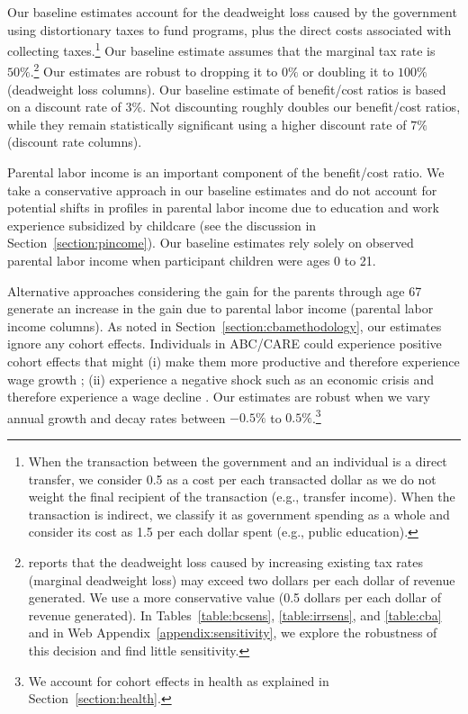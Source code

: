 Our baseline estimates account for the deadweight loss caused by the government using distortionary taxes to fund programs, plus the direct costs associated with collecting taxes.\footnote{When the transaction between the government and an individual is a direct transfer, we consider 0.5 as a cost per each transacted dollar as we do not weight the final recipient of the transaction (e.g., transfer income). When the transaction is indirect, we classify it as government spending as a whole and consider its cost as 1.5 per each dollar spent (e.g., public education).} Our baseline estimate assumes that the marginal tax rate is $50\%$.\footnote{\citet{Feldstein_1999_REStat} reports that the deadweight loss caused by increasing existing tax rates (marginal deadweight loss) may exceed two dollars per each dollar of revenue generated. We use a more conservative value (0.5 dollars per each dollar of revenue generated). In Tables~\ref{table:bcsens}, \ref{table:irrsens}, and \ref{table:cba} and in Web Appendix~\ref{appendix:sensitivity}, we explore the robustness of this decision and find little sensitivity.} Our estimates are robust to dropping it to $0\%$ or doubling it to $100\%$ (deadweight loss columns). Our baseline estimate of benefit/cost ratios is based on a discount rate of $3\%$. Not discounting roughly doubles our benefit/cost ratios, while they remain statistically significant using a higher discount rate of $7\%$ (discount rate columns).

Parental labor income is an important component of the benefit/cost ratio. We take a conservative approach in our baseline estimates and do not account for potential shifts in profiles in parental labor income due to education and work experience subsidized by childcare (see the discussion in Section~\ref{section:pincome}). Our baseline estimates rely solely on observed parental labor income when participant children were ages 0 to 21.

Alternative approaches considering the gain for the parents through age 67 generate an increase in the gain due to parental labor income (parental labor income columns). As noted in Section~\ref{section:cbamethodology}, our estimates ignore any cohort effects. Individuals in ABC/CARE could experience positive cohort effects that might (i) make them more productive and therefore experience wage growth \citep{Lagakos_Moll_etal_2016_LifeCycle_NBER}; (ii) experience a negative shock such as an economic crisis and therefore experience a wage decline \citep{Jarosch_2016_JobSecurity_Econometrica}. Our estimates are robust when we vary annual growth and decay rates between $-0.5\%$ to $0.5\%$.\footnote{We account for cohort effects in health as explained in Section~\ref{section:health}.}

